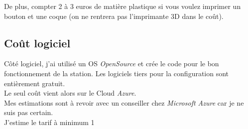 De plus, compter 2 à 3 euros de matière plastique si vous voulez imprimer un bouton et une coque (on ne rentrera pas l'imprimante 3D dans le coût).\\

\subsection{Coût logiciel}

Côté logiciel, j'ai utilisé un OS \textit{OpenSource} et crée le code pour le bon fonctionnement de la station. Les logiciels tiers pour la configuration sont entièrement gratuit.\\

Le seul coût vient alors sur le Cloud \textit{Azure}.\\

Mes estimations sont à revoir avec un conseiller chez \textit{Microsoft Azure} car je ne suis pas certain.\\

J'estime le tarif à minimum 1






